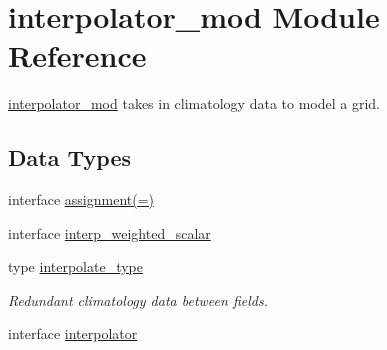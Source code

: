 \hypertarget{namespaceinterpolator__mod}{}\section{interpolator\+\_\+mod Module Reference}
\label{namespaceinterpolator__mod}


\hyperlink{namespaceinterpolator__mod}{interpolator\+\_\+mod} takes in climatology data to model a grid.  


\subsection*{Data Types}
\begin{DoxyCompactItemize}
\item 
interface \hyperlink{interfaceinterpolator__mod_1_1assignment_07_0A_08}{assignment(=)}
\item 
interface \hyperlink{interfaceinterpolator__mod_1_1interp__weighted__scalar}{interp\+\_\+weighted\+\_\+scalar}
\item 
type \hyperlink{structinterpolator__mod_1_1interpolate__type}{interpolate\+\_\+type}
\begin{DoxyCompactList}\small\item\em Redundant climatology data between fields. \end{DoxyCompactList}\item 
interface \hyperlink{interfaceinterpolator__mod_1_1interpolator}{interpolator}
\end{DoxyCompactItemize}
